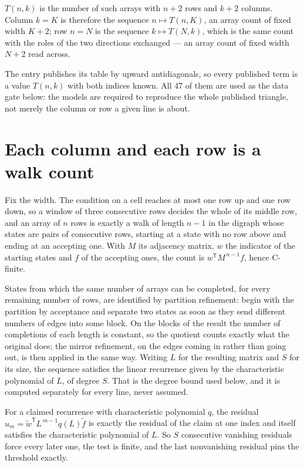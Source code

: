 \documentclass[11pt]{article}
\theoremstyle{definition}
\begin{document}
$T(n,k)$ is the number of such arrays with $n + 2$ rows and $k + 2$ columns. Column $k = K$ is therefore the sequence $n \mapsto T(n,K)$, an array count of fixed width $K + 2$; row $n = N$ is the sequence $k \mapsto T(N,k)$, which is the same count with the roles of the two directions exchanged --- an array count of fixed width $N + 2$ read across.

The entry publishes its table by upward antidiagonals, so every published term is a value $T(n,k)$ with both indices known. All 47 of them are used as the data gate below: the models are required to reproduce the whole published triangle, not merely the column or row a given line is about.

\section{Each column and each row is a walk count}

Fix the width. The condition on a cell reaches at most one row up and one row down, so a window of three consecutive rows decides the whole of its middle row, and an array of $n$ rows is exactly a walk of length $n-1$ in the digraph whose states are pairs of consecutive rows, starting at a state with no row above and ending at an accepting one. With $M$ its adjacency matrix, $w$ the indicator of the starting states and $f$ of the accepting ones, the count is $w^{\mathsf T}M^{\,n-1}f$, hence C-finite.

States from which the same number of arrays can be completed, for every remaining number of rows, are identified by partition refinement: begin with the partition by acceptance and separate two states as soon as they send different numbers of edges into some block. On the blocks of the result the number of completions of each length is constant, so the quotient counts exactly what the original does; the mirror refinement, on the edges coming in rather than going out, is then applied in the same way. Writing $L$ for the resulting matrix and $S$ for its size, the sequence satisfies the linear recurrence given by the characteristic polynomial of $L$, of degree $S$. That is the degree bound used below, and it is computed separately for every line, never assumed.

For a claimed recurrence with characteristic polynomial $q$, the residual $u_m = \tilde w^{\mathsf T}L^{\,m-1}q(L)\tilde f$ is exactly the residual of the claim at one index and itself satisfies the characteristic polynomial of $L$. So $S$ consecutive vanishing residuals force every later one, the test is finite, and the last nonvanishing residual pins the threshold exactly.
\end{document}
